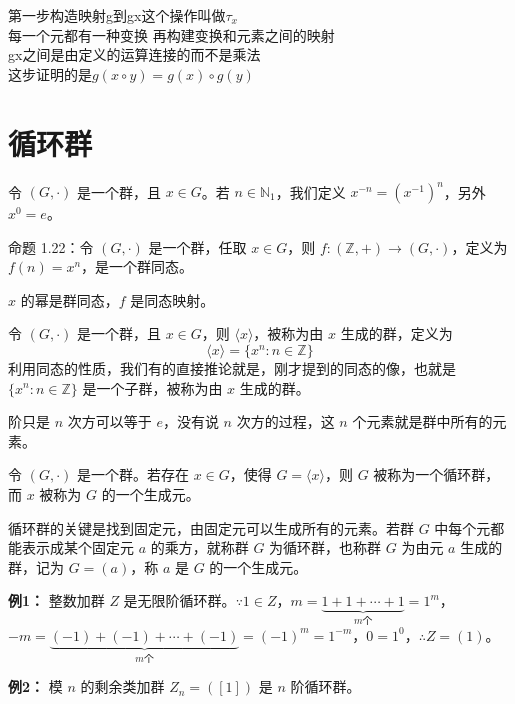 \begin{note}[凯莱定理任何群都是同一个群的同构]
第一步构造映射g到gx这个操作叫做$\tau_x$ \\
每一个元都有一种变换 再构建变换和元素之间的映射 \\
gx之间是由定义的运算连接的而不是乘法 \\
这步证明的是$g(x\circ y)=g(x)\circ g(y)$
\end{note}

\section{循环群}

\begin{definition}[定义 1.22：$x$ 的幂]
令 $(G,\cdot)$ 是一个群，且 $x\in G$。若 $n\in\mathbb{N}_1$，我们定义 $x^{-n}=(x^{-1})^n$，另外 $x^0=e$。

命题 1.22：令 $(G,\cdot)$ 是一个群，任取 $x\in G$，则 $f:(\mathbb{Z},+)\to(G,\cdot)$，定义为 $f(n)=x^n$，是一个群同态。

$x$ 的幂是群同态，$f$ 是同态映射。
\end{definition}

\begin{definition}[由 $x$ 生成子群（定义 1.23）]
令 $(G,\cdot)$ 是一个群，且 $x\in G$，则 $\langle x\rangle$，被称为由 $x$ 生成的群，定义为
\[
\langle x\rangle=\{x^n:n\in\mathbb{Z}\}
\]
利用同态的性质，我们有的直接推论就是，刚才提到的同态的像，也就是 $\{x^n:n\in\mathbb{Z}\}$ 是一个子群，被称为由 $x$ 生成的群。

阶只是 $n$ 次方可以等于 $e$，没有说 $n$ 次方的过程，这 $n$ 个元素就是群中所有的元素。
\end{definition}

\begin{definition}[循环群（定义 1.25）]
令 $(G,\cdot)$ 是一个群。若存在 $x\in G$，使得 $G=\langle x\rangle$，则 $G$ 被称为一个循环群，而 $x$ 被称为 $G$ 的一个生成元。

循环群的关键是找到固定元，由固定元可以生成所有的元素。若群 $G$ 中每个元都能表示成某个固定元 $a$ 的乘方，就称群 $G$ 为循环群，也称群 $G$ 为由元 $a$ 生成的群，记为 $G=(a)$，称 $a$ 是 $G$ 的一个生成元。

\textbf{例1：} 整数加群 $Z$ 是无限阶循环群。$\because 1\in Z$，$m=\underbrace{1+1+\cdots+1}_{m\text{个}}=1^m$，$-m=\underbrace{(-1)+(-1)+\cdots+(-1)}_{m\text{个}}=(-1)^m=1^{-m}$，$0=1^0$，$\therefore Z=(1)$。

\textbf{例2：} 模 $n$ 的剩余类加群 $Z_n=([1])$ 是 $n$ 阶循环群。
\end{definition}

